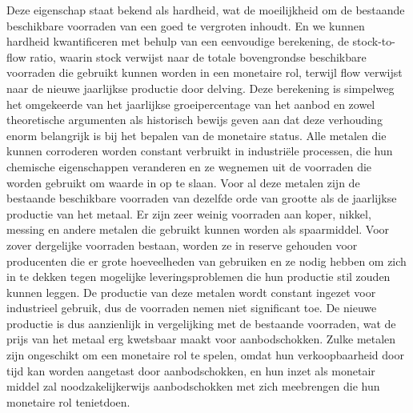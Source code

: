 Deze eigenschap staat bekend als hardheid, wat de moeilijkheid om de bestaande beschikbare voorraden van een goed te vergroten inhoudt. En we kunnen hardheid kwantificeren met behulp van een eenvoudige berekening, de stock-to-flow ratio, waarin stock verwijst naar de totale bovengrondse beschikbare voorraden die gebruikt kunnen worden in een monetaire rol, terwijl flow verwijst naar de nieuwe jaarlijkse productie door delving. Deze berekening is simpelweg het omgekeerde van het jaarlijkse groeipercentage van het aanbod en zowel theoretische argumenten als historisch bewijs geven aan dat deze verhouding enorm belangrijk is bij het bepalen van de monetaire status. Alle metalen die kunnen corroderen worden constant verbruikt in industriële processen, die hun chemische eigenschappen veranderen en ze wegnemen uit de voorraden die worden gebruikt om waarde in op te slaan. Voor al deze metalen zijn de bestaande beschikbare voorraden van dezelfde orde van grootte als de jaarlijkse productie van het metaal. Er zijn zeer weinig voorraden aan koper, nikkel, messing en andere metalen die gebruikt kunnen worden als spaarmiddel. Voor zover dergelijke voorraden bestaan, worden ze in reserve gehouden voor producenten die er grote hoeveelheden van gebruiken en ze nodig hebben om zich in te dekken tegen mogelijke leveringsproblemen die hun productie stil zouden kunnen leggen. De productie van deze metalen wordt constant ingezet voor industrieel gebruik, dus de voorraden nemen niet significant toe. De nieuwe productie is dus aanzienlijk in vergelijking met de bestaande voorraden, wat de prijs van het metaal erg kwetsbaar maakt voor aanbodschokken. Zulke metalen zijn ongeschikt om een monetaire rol te spelen, omdat hun verkoopbaarheid door tijd kan worden aangetast door aanbodschokken, en hun inzet als monetair middel zal noodzakelijkerwijs aanbodschokken met zich meebrengen die hun monetaire rol tenietdoen.

